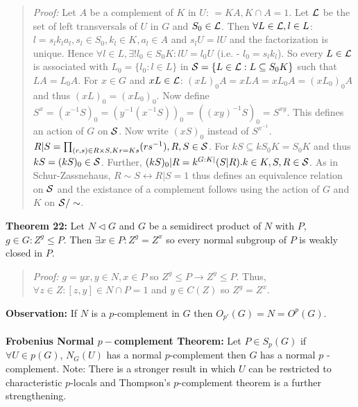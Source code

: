 \begin{quote}
\emph{Proof:}  
Let $A$ be a complement of $K$ in $U$: $=KA, K \cap A = 1$.  
Let ${\cal L}$ be the set of left transversals of $U$ in $G$ and $S_0 \in {\cal L}$.
Then $\forall L \in {\cal L}, l \in L$:
$l=s_l k_l a_l, s_l \in S_0, k_l \in K, a_l \in A$ and $s_l U = lU$ and the factorization is
unique.  Hence
$\forall l \in L, \exists! l_0 \in S_0 K: lU=l_0 U$ (i.e. - $l_0=s_l k_l$).  So every
$L \in {\cal L}$ is associated with $L_0 = \{ l_0 : l \in L \}$ in
${\cal S} = \{ L \in {\cal L}: L \subseteq S_0 K \}$ such that $LA= L_0 A$.  For $x \in G$ and
$xL \in {\cal L}$: $(xL)_0A = xLA = x L_0 A = (xL_0)_0 A$ and thus $(xL)_0 = (x L_0)_0$.
Now define $S^x= (x^{-1} S)_0 = (y^{-1} ( x^{-1} S))_0 = ((xy)^{-1} S)_0 = S^{xy}$.
This defines an action of $G$ on ${\cal S}$.  Now write $(xS)_0$ instead of $S^{x^{-1}}$.
$R|S= \prod_{(r,s) \in R \times S, Kr=Ks} (rs^{-1}), R, S \in {\cal S}$.  For
$kS \subseteq k S_0 K= S_0 K$ and thus $kS = (kS)_0 \in {\cal S}$.  Further,
$(kS)_0|R = k^{G:K|} (S|R). k \in K, S,R \in {\cal S}$.  As in Schur-Zassnehaus,
$R \sim S  \leftrightarrow R|S=1$ thus defines an equivalence relation on ${\cal S}$
and the existance of a complement follows using the action of $G$ and $K$ on ${\cal S}/ \sim$.
\end{quote}
{\bf Theorem 22:} 
Let $N \lhd G$ and $G$ be a semidirect product of $N$ with $P$, $g \in G: Z^g \le P$.  Then
$\exists x \in P: Z^g = Z^x$ so every normal subgroup of $P$ is weakly closed in $P$.
\begin{quote} 
\emph{Proof:}  
$g=yx, y \in N, x \in P$ so $Z^g \le P \rightarrow Z^y \le P$.  Thus, $\forall z \in Z:
[z,y] \in N \cap P =1$ and $y \in C(Z)$ so $Z^g=Z^x$.
\end{quote}
{\bf Observation:} If $N$ is a $p$-complement in $G$ then $O_{p'}(G)=N=O^{p}(G)$.
\\
\\
{\bf Frobenius Normal $p-$complement Theorem:}  Let $P \in S_p(G)$ if $\forall U \in p(G)$,
$N_G(U)$ has a normal $p$-complement then $G$ has a normal $p$ -complement.  Note: There is a
stronger result in which $U$ can be restricted to characteristic $p$-locals and Thompson's
$p$-complement theorem is a further strengthening.
